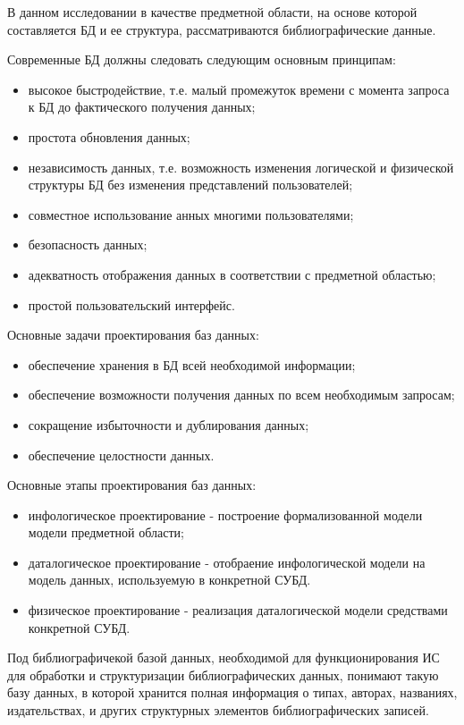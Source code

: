 В данном исследовании в качестве предметной области, на основе которой составляется БД и ее структура, рассматриваются библиографические данные.

Современные БД должны следовать следующим основным принципам:
\begin{itemize}
	\item высокое быстродействие, т.е. малый промежуток времени с момента запроса к БД до фактического получения данных;
	\item простота обновления данных;
	\item независимость данных, т.е. возможность изменения логической и физической структуры БД без изменения представлений пользователей;
	\item совместное использование анных многими пользователями;
	\item безопасность данных;
	\item адекватность отображения данных в соответствии с предметной областью;
	\item простой пользовательский интерфейс.
\end{itemize}

Основные задачи проектирования баз данных:
\begin{itemize}
	\item обеспечение хранения в БД всей необходимой информации;
	\item обеспечение возможности получения данных по всем необходимым запросам;
	\item сокращение избыточности и дублирования данных;
	\item обеспечение целостности данных.
\end{itemize}

Основные этапы проектирования баз данных:
\begin{itemize}
	\item инфологическое проектирование - построение формализованной модели модели предметной области;
	\item даталогическое проектирование - отобраение инфологической модели на модель данных, используемую в конкретной СУБД.
	\item физическое проектирование - реализация даталогической модели средствами конкретной СУБД.
\end{itemize}

Под библиографичекой базой данных, необходимой для функционирования ИС для обработки и структуризации библиографических данных, понимают такую базу данных, в которой хранится полная информация о типах, авторах, названиях, издательствах, и других структурных элементов библиографических записей.

